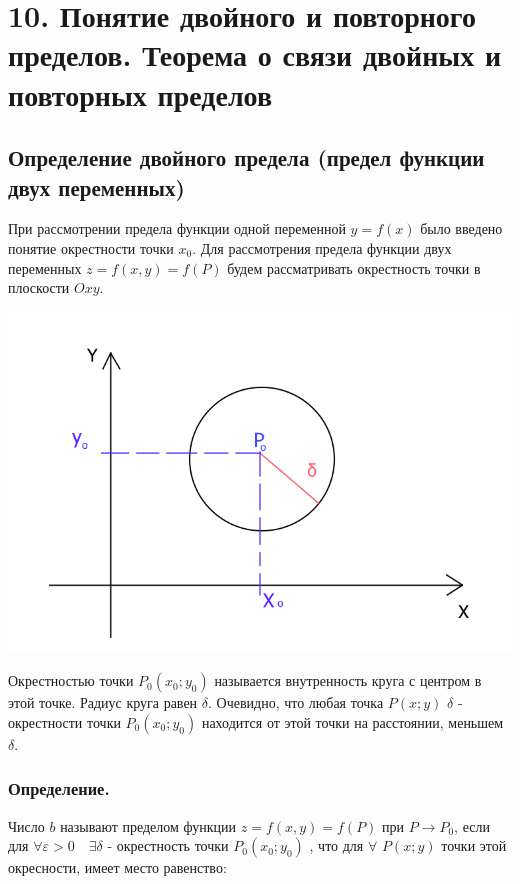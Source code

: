 \section{10. Понятие двойного и повторного пределов. Теорема о связи
двойных и повторных пределов}

\subsection{Определение двойного предела (предел функции двух
переменных)}

При рассмотрении предела функции одной переменной \(y=f(x)\) было
введено понятие окрестности точки \(x_{0}\). Для рассмотрения предела
функции двух переменных \(z=f\left(x, y\right)=f(P)\) будем
рассматривать окрестность точки в плоскости \(Oxy\).

\includegraphics[width=\linewidth]{10img.png}

Окрестностью точки \(P_{0}\left(x_{0}; y_{0}\right)\) называется
внутренность круга с центром в этой точке. Радиус круга равен
\(\delta\). Очевидно, что любая точка \(P\left(x; y\right)\) \(\delta\)
- окрестности точки \(P_{0}\left(x_{0}; y_{0}\right)\) находится от этой
точки на расстоянии, меньшем \(\delta\).

\subsubsection{Определение.}

Число \(b\) называют пределом функции \(z=f(x, y)=f(P)\) при
\(P \rightarrow P_{0}\), если для
\(\forall \varepsilon>0 \quad \exists \delta\) - окрестность точки
\(P_{0}\left(x_{0}; y_{0}\right)\) , что для \(\forall\)
\(P\left(x; y\right)\) точки этой окресности, имеет место равенство:

